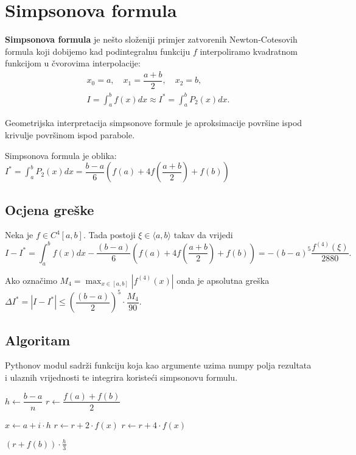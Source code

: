 \section{Simpsonova formula}

\textbf{Simpsonova formula} je nešto složeniji primjer zatvorenih Newton-Cotesovih
formula koji dobijemo kad podintegralnu funkciju $f$ interpoliramo kvadratnom
funkcijom u čvorovima interpolacije:
\begin{gather*}
    x_0 = a,\quad x_1=\dfrac{a+b}{2},\quad x_2 = b,\\
    I = \int_a^b f(x)dx \approx I^* = \int_a^b P_2(x)dx.
\end{gather*}

Geometrijska interpretacija simpsonove formule je aproksimacije površine ispod krivulje površinom ispod parabole.

Simpsonova formula je oblika: $\displaystyle
I^* = \int_a^b P_2(x)dx = \dfrac{b-a}{6}\left(f(a) + 4f\left(\dfrac{a+b}{2}\right) + f(b)\right)
$

\subsection{Ocjena greške}

Neka je $f\in C^4[a,b]$. Tada postoji $\xi \in \langle a,b\rangle$ takav da vrijedi
$$
I - I^* = \int_a^b f(x) dx - \dfrac{(b-a)}{6}\left(f(a) + 4f\left(\dfrac{a+b}{2}\right) + f(b)\right) = -(b-a)^5\dfrac{f^{(4)}(\xi)}{2880}.
$$

Ako označimo $\displaystyle M_4 = \max_{x\in[a,b]}|f^{(4)}(x)|$ onda je apsolutna
greška $\displaystyle \Delta I^* = |I - I^*| \leq \left(\dfrac{(b-a)}{2}\right)^5 \cdot \dfrac{M_4}{90}.$


\subsection{Algoritam}

Pythonov  modul sadrži  funkciju koja kao
argumente uzima numpy polja rezultata i ulaznih vrijednosti te integrira
koristeći simpsonovu formulu.

\begin{algorithmic}
    \State $h \gets \dfrac{b - a}{n}$
    \State $r \gets \dfrac{f(a) + f(b)}{2}$

        \State $x \gets a + i \cdot h$
            \State $r \gets r + 2 \cdot f(x)$
        \Else
            \State $r \gets r + 4 \cdot f(x)$
        \EndIf
    \EndFor

    \State \Return $(r + f(b)) \cdot \frac{h}{3}$
\EndFunction
\end{algorithmic}

